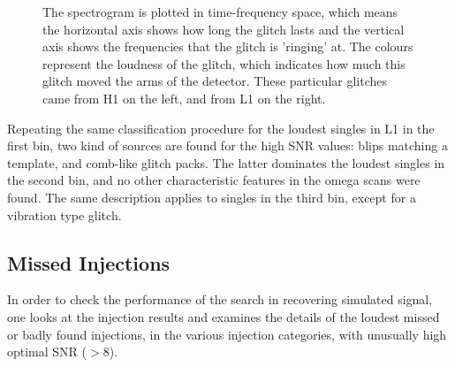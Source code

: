 \documentclass[binding=0.6cm, LaM]{sapthesis}
\begin{document}
                \begin{figure}[h]
                        \noindent
                        \label{glitch}
                        \centering
                        \caption{The spectrogram is plotted in time-frequency space, which means the horizontal axis shows how long the glitch lasts and the vertical axis shows the frequencies that the glitch is 'ringing' at. The colours represent the loudness of the glitch, which indicates how much this glitch moved the arms of the detector. These particular glitches came from H1 on the left, and  from L1 on the right.}
                        \label{fig:glitch}
                \end{figure}
	Repeating the same classification procedure for the loudest singles in L1 in the first bin,	
	two kind of sources are found for  the  high SNR values: 
	blips matching a template, and comb-like glitch packs.
	The latter dominates the loudest singles in the second bin,
	and no other characteristic features in the omega scans were found.
	The same description applies to singles in the third bin, except for a vibration type glitch.
\subsection{Missed Injections}
	In order to check the performance of the search in recovering simulated signal,
	one looks at the injection results and examines the details of the loudest 
	missed or badly found injections, in the various injection categories, 
	with unusually high optimal SNR ($>$8).
\end{document}
